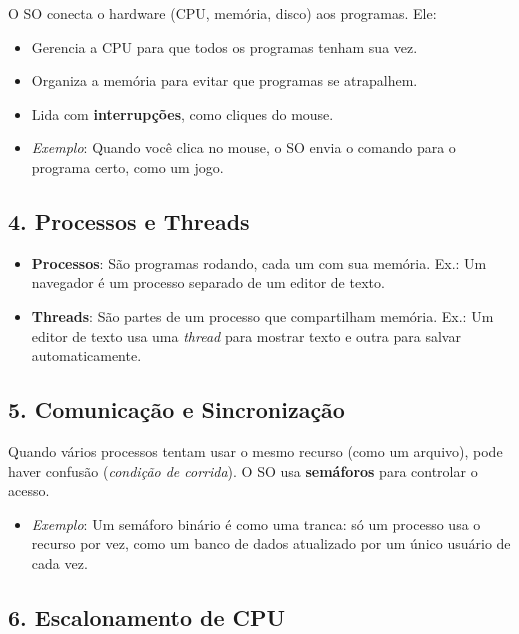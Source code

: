 \documentclass[a4paper,12pt]{article}
\begin{document}
O SO conecta o hardware (CPU, memória, disco) aos programas. Ele:

\begin{itemize}
    \item Gerencia a CPU para que todos os programas tenham sua vez.
    \item Organiza a memória para evitar que programas se atrapalhem.
    \item Lida com \textbf{interrupções}, como cliques do mouse.

    \item[] \textit{Exemplo}: Quando você clica no mouse, o SO envia o comando para o programa certo, como um jogo.
\end{itemize}

\subsection*{4. Processos e Threads}

\begin{itemize}
    \item \textbf{Processos}: São programas rodando, cada um com sua memória. Ex.: Um navegador é um processo separado de um editor de texto.
    \item \textbf{Threads}: São partes de um processo que compartilham memória. Ex.: Um editor de texto usa uma \textit{thread} para mostrar texto e outra para salvar automaticamente.
\end{itemize}

\subsection*{5. Comunicação e Sincronização}

Quando vários processos tentam usar o mesmo recurso (como um arquivo), pode haver confusão (\textit{condição de corrida}). O SO usa \textbf{semáforos} para controlar o acesso.

\begin{itemize}
    \item \textit{Exemplo}: Um semáforo binário é como uma tranca: só um processo usa o recurso por vez, como um banco de dados atualizado por um único usuário de cada vez.
\end{itemize}

\subsection*{6. Escalonamento de CPU}
\end{document}
